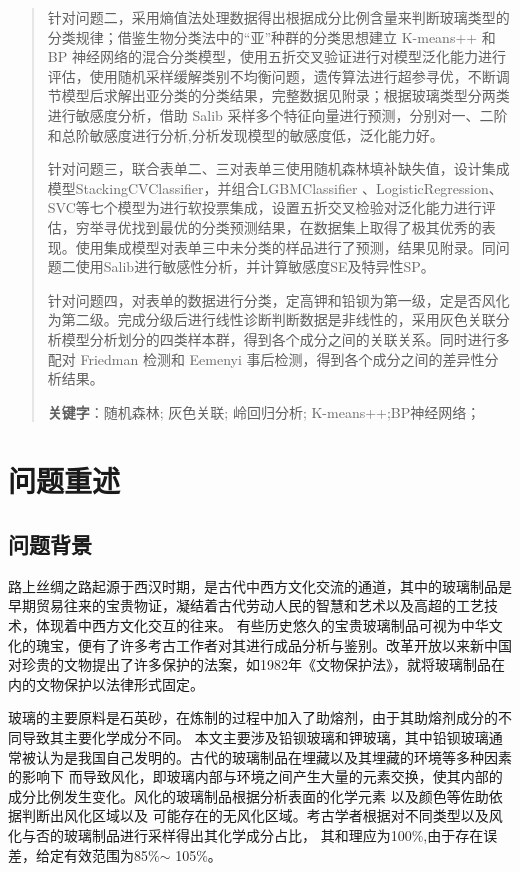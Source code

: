 \documentclass[UTF8]{ctexart}
\begin{document}
\begin{abstract}
    针对问题二，采用熵值法处理数据得出根据成分比例含量来判断玻璃类型的分类规律；借鉴生物分类法中的“亚”种群的分类思想建立 K-means++ 和BP 神经网络的混合分类模型，使用五折交叉验证进行对模型泛化能力进行评估，使用随机采样缓解类别不均衡问题，遗传算法进行超参寻优，不断调节模型后求解出亚分类的分类结果，完整数据见附录；根据玻璃类型分两类进行敏感度分析，借助 Salib 采样多个特征向量进行预测，分别对一、二阶和总阶敏感度进行分析,分析发现模型的敏感度低，泛化能力好。

    针对问题三，联合表单二、三对表单三使用随机森林填补缺失值，设计集成模型StackingCVClassifier，并组合LGBMClassifier 、LogisticRegression、SVC等七个模型为进行软投票集成，设置五折交叉检验对泛化能力进行评估，穷举寻优找到最优的分类预测结果，在数据集上取得了极其优秀的表现。使用集成模型对表单三中未分类的样品进行了预测，结果见附录。同问题二使用Salib进行敏感性分析，并计算敏感度SE及特异性SP。

    针对问题四，对表单的数据进行分类，定高钾和铅钡为第一级，定是否风化为第二级。完成分级后进行线性诊断判断数据是非线性的，采用灰色关联分析模型分析划分的四类样本群，得到各个成分之间的关联关系。同时进行多配对 Friedman 检测和 Eemenyi 事后检测，得到各个成分之间的差异性分析结果。

    \vspace{4em}
    \thispagestyle{empty}
    \textbf{关键字}：随机森林; 灰色关联;  岭回归分析; K-means++;BP神经网络；   %
\end{abstract}



\setcounter{page}{1}  %

\section{问题重述}

\subsection{问题背景}
路上丝绸之路起源于西汉时期，是古代中西方文化交流的通道，其中的玻璃制品是早期贸易往来的宝贵物证，凝结着古代劳动人民的智慧和艺术以及高超的工艺技术，体现着中西方文化交互的往来。
有些历史悠久的宝贵玻璃制品可视为中华文化的瑰宝，便有了许多考古工作者对其进行成品分析与鉴别。改革开放以来新中国对珍贵的文物提出了许多保护的法案，如1982年《文物保护法》，就将玻璃制品在内的文物保护以法律形式固定。

玻璃的主要原料是石英砂，在炼制的过程中加入了助熔剂，由于其助熔剂成分的不同导致其主要化学成分不同。
本文主要涉及铅钡玻璃和钾玻璃，其中铅钡玻璃通常被认为是我国自己发明的。古代的玻璃制品在埋藏以及其埋藏的环境等多种因素的影响下
而导致风化，即玻璃内部与环境之间产生大量的元素交换，使其内部的成分比例发生变化。风化的玻璃制品根据分析表面的化学元素
以及颜色等佐助依据判断出风化区域以及
可能存在的无风化区域。考古学者根据对不同类型以及风化与否的玻璃制品进行采样得出其化学成分占比，
其和理应为100$\%$,由于存在误差，给定有效范围为85$\%$$ \sim $ 105$\%$。
\end{document}
